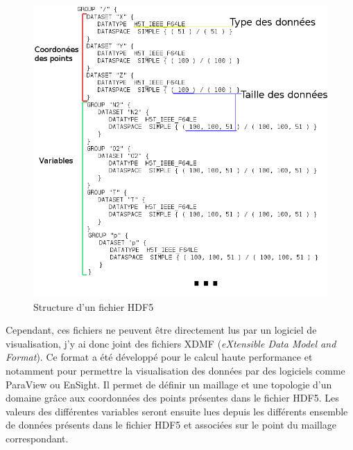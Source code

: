 \begin{figure}[h!]
  \centering
  \includegraphics[scale=0.5]{figures/hdf5_struct.png}
  \caption{\label{fig:hdf5_struct} Structure d'un fichier HDF5}
\end{figure}

Cependant, ces fichiers ne peuvent être directement lus par un logiciel de visualisation, j'y ai donc joint des fichiers XDMF (\textit{eXtensible Data Model and Format}). Ce format a été développé pour le calcul haute performance et notamment pour permettre la visualisation des données par des logiciels comme ParaView ou EnSight. Il permet de définir un maillage et une topologie d'un domaine grâce aux coordonnées des points présentes dans le fichier HDF5. Les valeurs des différentes variables seront ensuite lues depuis les différents ensemble de données présents dans le fichier HDF5 et associées sur le point du maillage correspondant.



